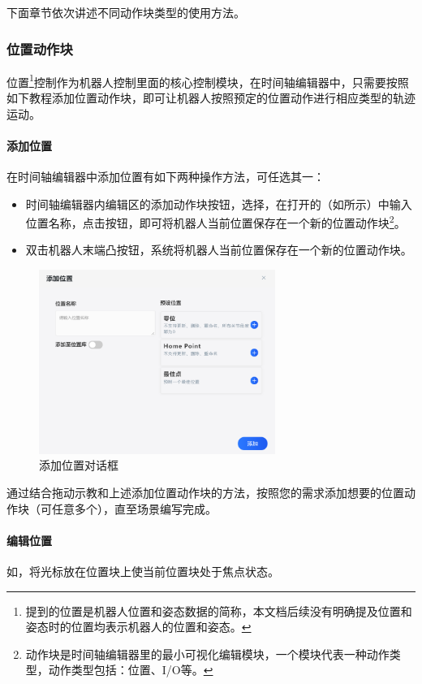 下面章节依次讲述不同动作块类型的使用方法。

\subsubsection{位置动作块}
位置\footnote{{\ThisBook}提到的位置是机器人位置和姿态数据的简称，本文档后续没有明确提及位置和姿态时的位置均表示机器人的位置和姿态。}控制作为机器人控制里面的核心控制模块，在时间轴编辑器中，只需要按照如下教程添加位置动作块，即可让机器人按照预定的位置动作进行相应类型的轨迹运动。
\paragraph{添加位置}
在时间轴编辑器中添加位置有如下两种操作方法，可任选其一：
\begin{itemize}
	\item 时间轴编辑器内编辑区的添加动作块按钮，选择，在打开的（如所示）中输入位置名称，点击按钮，即可将机器人当前位置保存在一个新的位置动作块\footnote{动作块是时间轴编辑器里的最小可视化编辑模块，一个模块代表一种动作类型，动作类型包括：位置、I/O等。}。
	\item 双击机器人末端凸按钮，系统将机器人当前位置保存在一个新的位置动作块。
\end{itemize}

\begin{figure}[ht]
	\centering
	\includegraphics[height=6cm]{screen/3-6.png}
	\caption{添加位置对话框}
	\label{fig:添加位置对话框}
\end{figure}

通过结合拖动示教和上述添加位置动作块的方法，按照您的需求添加想要的位置动作块（可任意多个），直至场景编写完成。

\paragraph{编辑位置}
\label{sec:编辑位置}
如，将光标放在位置块上使当前位置块处于焦点状态。

